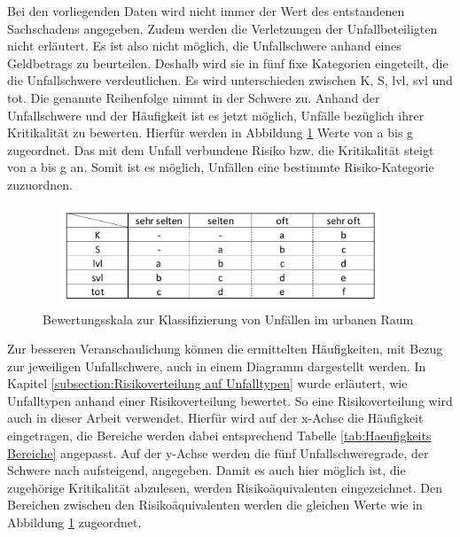 Bei den vorliegenden Daten wird nicht immer der Wert des entstandenen Sachschadens angegeben. Zudem werden die Verletzungen der Unfallbeteiligten nicht erläutert. Es ist also nicht möglich, die Unfallschwere anhand eines Geldbetrags zu beurteilen. Deshalb wird sie in fünf fixe Kategorien eingeteilt, die die Unfallschwere verdeutlichen. Es wird unterschieden zwischen \ac{K}, \ac{S}, \ac{lvl}, \ac{svl} und \ac{tot}. Die genannte Reihenfolge nimmt in der Schwere zu. Anhand der Unfallschwere und der Häufigkeit ist es jetzt möglich, Unfälle bezüglich ihrer Kritikalität zu bewerten. Hierfür werden in Abbildung \ref{fig:Bewertungsskala} Werte von a bis g zugeordnet. Das mit dem Unfall verbundene Risiko bzw. die Kritikalität steigt von a bis g an. Somit ist es möglich, Unfällen eine bestimmte Risiko-Kategorie zuzuordnen.

\begin{savenotes}
	\begin{figure}[H]
		\centering
		\includegraphics[width=10.6cm,height=3cm]{figures/Bewertungsskala}
		\caption[Bewertungsskala zur Klassifizierung von Unfällen im urbanen Raum]{Bewertungsskala zur Klassifizierung von Unfällen im urbanen Raum}\label{fig:Bewertungsskala}
	\end{figure}
\end{savenotes}

Zur besseren Veranschaulichung können die ermittelten Häufigkeiten, mit Bezug zur jeweiligen Unfallschwere, auch in einem Diagramm dargestellt werden. In Kapitel \ref{subsection:Risikoverteilung auf Unfalltypen} wurde erläutert, wie \Textcite[S. 60]{Gschwendtner.2015} Unfalltypen anhand einer Risikoverteilung bewertet. So eine Risikoverteilung wird auch in dieser Arbeit verwendet. Hierfür wird auf der x-Achse die Häufigkeit eingetragen, die Bereiche werden dabei entsprechend Tabelle \ref{tab:Haeufigkeits Bereiche} angepasst. Auf der y-Achse werden die fünf Unfallschweregrade, der Schwere nach aufsteigend, angegeben. Damit es auch hier möglich ist, die zugehörige Kritikalität abzulesen, werden Risikoäquivalenten eingezeichnet. Den Bereichen zwischen den Risikoäquivalenten werden die gleichen Werte wie in Abbildung \ref{fig:Bewertungsskala} zugeordnet.

